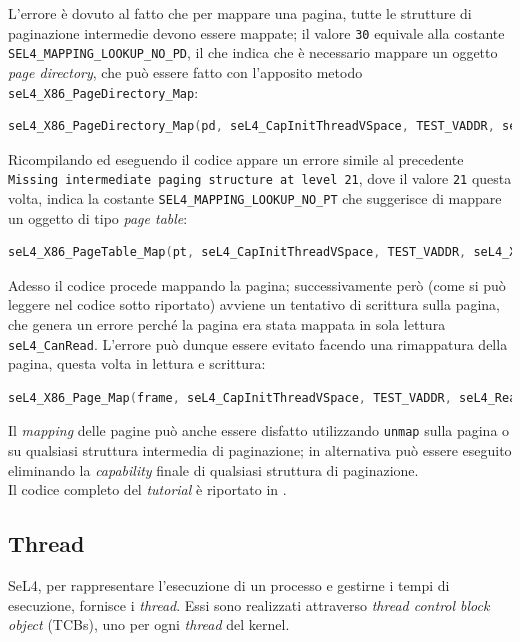 L'errore è dovuto al fatto che per mappare una pagina, tutte le strutture di paginazione intermedie devono essere mappate; il valore \texttt{30} equivale alla costante \texttt{SEL4\_MAPPING\_LOOKUP\_NO\_PD}, il che indica che è necessario mappare un oggetto \textit{page directory}, che può essere fatto con l'apposito metodo \texttt{seL4\_X86\_PageDirectory\_Map}:
\begin{lstlisting}[language=C++]
seL4_X86_PageDirectory_Map(pd, seL4_CapInitThreadVSpace, TEST_VADDR, seL4_X86_Default_VMAttributes);
\end{lstlisting}

Ricompilando ed eseguendo il codice appare un errore simile al precedente \texttt{Missing intermediate paging structure at level 21}, dove il valore \texttt{21} questa volta, indica la costante \texttt{SEL4\_MAPPING\_LOOKUP\_NO\_PT} che suggerisce di mappare un oggetto di tipo \textit{page table}:
\begin{lstlisting}[language=C++]
seL4_X86_PageTable_Map(pt, seL4_CapInitThreadVSpace, TEST_VADDR, seL4_X86_Default_VMAttributes);
\end{lstlisting}

Adesso il codice procede mappando la pagina; successivamente però (come si può leggere nel codice sotto riportato) avviene un tentativo di scrittura sulla pagina, che genera un errore perché la pagina era stata mappata in sola lettura \texttt{seL4\_CanRead}. L'errore può dunque essere evitato facendo una rimappatura della pagina, questa volta in lettura e scrittura:
\begin{lstlisting}[language=C++]
seL4_X86_Page_Map(frame, seL4_CapInitThreadVSpace, TEST_VADDR, seL4_ReadWrite, seL4_X86_Default_VMAttributes);
\end{lstlisting}

Il \textit{mapping} delle pagine può anche essere disfatto utilizzando \texttt{unmap} sulla pagina o su qualsiasi struttura intermedia di paginazione; in alternativa può essere eseguito eliminando la \textit{capability} finale di qualsiasi struttura di paginazione.\\
Il codice completo del \textit{tutorial} è riportato in \cite{mapping}.

\subsection{Thread}
SeL4, per rappresentare l'esecuzione di un processo e gestirne i tempi di esecuzione, fornisce i \textit{thread}. Essi sono realizzati attraverso \textit{thread control block object} (TCBs), uno per ogni \textit{thread} del kernel.

